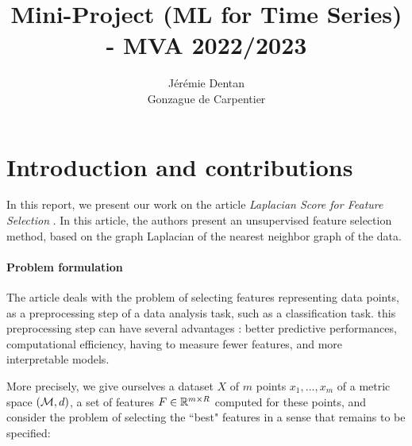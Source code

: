 \documentclass[11pt]{article}
\title{Mini-Project (ML for Time Series) - MVA 2022/2023}
\author{
Jérémie Dentan \email{jeremie.dentan@live.com} \\ %
Gonzague de Carpentier \email{decarpentierg@mail.com} %
}
\begin{document}
\maketitle

\section{Introduction and contributions}

In this report, we present our work on the article \textit{Laplacian Score for Feature Selection} \cite{he_laplacian_2005}. In this article, the authors present an unsupervised feature selection method, based on the graph Laplacian of the nearest neighbor graph of the data. 

\paragraph{Problem formulation} The article deals with the problem of selecting features representing data points, as a preprocessing step of a data analysis task, such as a classification task. this preprocessing step can have several advantages \cite{guyon_introduction_2003}: better predictive performances, computational efficiency, having to measure fewer features, and more interpretable models.

More precisely, we give ourselves a dataset $X$ of $m$ points $x_1, ..., x_m$ of a metric space $(\mathcal{M}, d)$, a set of features $F \in \mathbb{R}^{m \times R}$ computed for these points, and consider the problem of selecting the ``best" features in a sense that remains to be specified:


\end{document}
